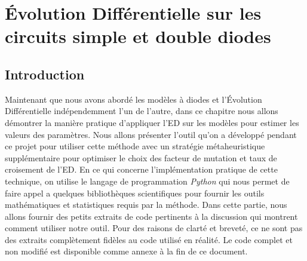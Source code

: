 \chapter{Évolution Différentielle sur les circuits simple et double diodes}

\section{Introduction}
Maintenant que nous avons abordé les modèles à diodes et l'Évolution Différentielle indépendemment l'un de l'autre, dans ce chapitre nous allons démontrer la manière pratique d'appliquer l'ED  sur les modèles pour estimer les valeurs des paramètres. Nous allons présenter l'outil qu'on a développé pendant ce projet pour utiliser cette méthode avec un stratégie métaheuristique supplémentaire pour optimiser le choix des facteur de mutation et taux de croisement de l'ED. En ce qui concerne l'implémentation pratique de cette technique, on utilise le langage de programmation \textit{Python} qui nous permet de faire appel a quelques bibliothèques scientifiques pour fournir les outils mathématiques et statistiques requis par la méthode. Dans cette partie, nous allons fournir des petits extraits de code pertinents à la discussion qui montrent comment utiliser notre outil. Pour des raisons de clarté et breveté, ce ne sont pas des extraits complètement fidèles au code utilisé en réalité. Le code complet et non modifié est disponible comme annexe à la fin de ce document. 

